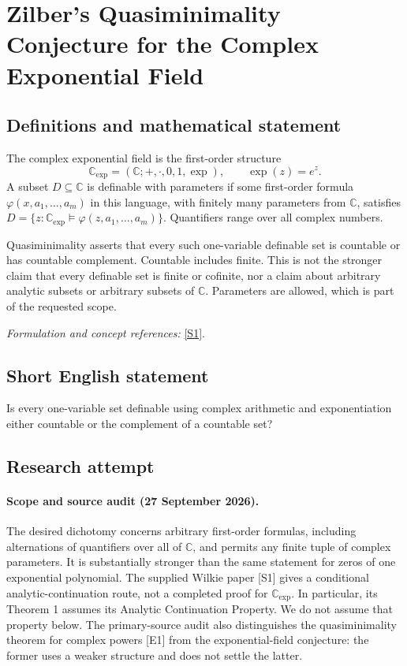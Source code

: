 \documentclass[11pt]{article}
\begin{document}
\section*{\texorpdfstring{Zilber's Quasiminimality Conjecture for the Complex Exponential Field}{Zilber's Quasiminimality Conjecture for the Complex Exponential Field}}\label{475}
\subsection{Definitions and mathematical statement}
The complex exponential field is the first-order structure
\[
 {\mathbb{C}}_{\exp}=({\mathbb{C}};+ ,\cdot,0,1,\exp),\qquad \exp(z)=e^z.
\]
A subset $D\subseteq{\mathbb{C}}$ is definable with parameters if some first-order formula $\varphi(x,a_1,\ldots,a_m)$ in this language, with finitely many parameters from ${\mathbb{C}}$, satisfies $D=\{z:{\mathbb{C}}_{\exp}\models\varphi(z,a_1,\ldots,a_m)\}$. Quantifiers range over all complex numbers.

Quasiminimality asserts that every such one-variable definable set is countable or has countable complement. Countable includes finite. This is not the stronger claim that every definable set is finite or cofinite, nor a claim about arbitrary analytic subsets or arbitrary subsets of ${\mathbb{C}}$. Parameters are allowed, which is part of the requested scope.
\par\smallskip\textit{Formulation and concept references:} \href{https://arxiv.org/pdf/2306.14562v1}{[S1]}.

\subsection{Short English statement}
Is every one-variable set definable using complex arithmetic and exponentiation either countable or the complement of a countable set?
\subsection{Research attempt}

\paragraph{Scope and source audit (27 September 2026).}
The desired dichotomy concerns arbitrary first-order formulas, including
alternations of quantifiers over all of $\mathbb C$, and permits any finite
tuple of complex parameters. It is substantially stronger than the same
statement for zeros of one exponential polynomial. The supplied Wilkie
paper [S1] gives a conditional analytic-continuation route, not a completed
proof for $\mathbb C_{\exp}$. In particular, its Theorem 1 assumes its
Analytic Continuation Property. We do not assume that property below.
The primary-source audit also distinguishes the quasiminimality theorem
for complex powers [E1] from the exponential-field conjecture: the former
uses a weaker structure and does not settle the latter.
\end{document}
